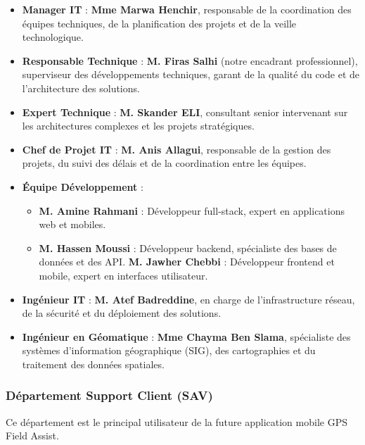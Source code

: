 \documentclass[12pt,a4paper]{report}
\begin{document}
\begin{itemize}
    \item \textbf{Manager IT} : \textbf{Mme Marwa Henchir}, responsable de la coordination des équipes techniques, de la planification des projets et de la veille technologique.
    
    \item \textbf{Responsable Technique} : \textbf{M. Firas Salhi} (notre encadrant professionnel), superviseur des développements techniques, garant de la qualité du code et de l'architecture des solutions.
    
    \item \textbf{Expert Technique} : \textbf{M. Skander ELI}, consultant senior intervenant sur les architectures complexes et les projets stratégiques.
    
    \item \textbf{Chef de Projet IT} : \textbf{M. Anis Allagui}, responsable de la gestion des projets, du suivi des délais et de la coordination entre les équipes.
    
    \item \textbf{Équipe Développement} :
    \begin{itemize}
        \item \textbf{M. Amine Rahmani} : Développeur full-stack, expert en applications web et mobiles.
        \item \textbf{M. Hassen Moussi} : Développeur backend, spécialiste des bases de données et des API.
        \textbf{M. Jawher Chebbi} : Développeur frontend et mobile, expert en interfaces utilisateur.
    \end{itemize}
    
    \item \textbf{Ingénieur IT} : \textbf{M. Atef Badreddine}, en charge de l'infrastructure réseau, de la sécurité et du déploiement des solutions.
    
    \item \textbf{Ingénieur en Géomatique} : \textbf{Mme Chayma Ben Slama}, spécialiste des systèmes d'information géographique (SIG), des cartographies et du traitement des données spatiales.
\end{itemize}

\subsubsection*{Département Support Client (SAV)}
\noindent Ce département est le principal utilisateur de la future application mobile GPS Field Assist.
\end{document}
